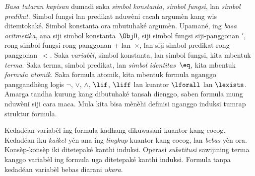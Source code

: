 \emph{Basa tataran kapisan} dumadi saka \emph{simbol konstanta},
\emph{simbol fungsi}, lan \emph{simbol predikat}. Simbol fungsi
lan predikat nduwèni cacah argumèn kang wis ditemtokaké.
Simbol konstanta ora mbutuhaké argumèn. Upamané, ing
\emph{basa aritmetika}, ana siji simbol konstanta~$\Obj 0$,
siji simbol fungsi siji-panggonan $\prime$, rong simbol fungsi
rong-panggonan $+$ lan~$\times$, lan siji simbol predikat
rong-panggonan~$<$. Saka \emph{variabèl}, simbol konstanta,
lan simbol fungsi, kita mbentuk \emph{terma}. Saka terma,
simbol predikat, lan \emph{simbol identitas}~$\eq$, kita
mbentuk \emph{formula atomik}. Saka formula atomik, kita
mbentuk formula nganggo panggandhèng logis $\lnot$, $\lor$,
$\land$, $\lif$, $\liff$ lan kuantor $\lforall$ lan $\lexists$.
Amarga tandha kurung kang dibutuhaké tansah dienggo, saben formula
mung nduwèni siji cara maca. Mula kita bisa mènèhi definisi
nganggo induksi tumrap struktur formula.

Kedadéan variabèl ing formula kadhang dikuwasani kuantor kang
cocog. Kedadéan iku \emph{kaiket} yèn ana ing \emph{lingkup}
kuantor kang cocog, lan \emph{bebas} yèn ora. Konsèp-konsèp
iki ditetepaké kanthi induksi. Operasi \emph{substitusi} sawijining
terma kanggo variabèl ing formula uga ditetepaké kanthi induksi.
Formula tanpa kedadéan variabèl bebas diarani \emph{ukara}.
